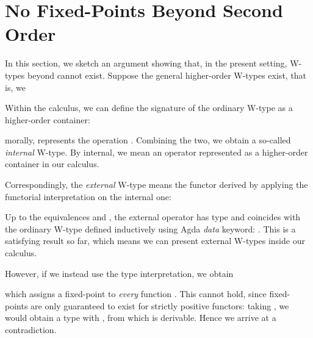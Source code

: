 \section{No Fixed-Points Beyond Second Order}
\label{sec:nogo}

In this section, we sketch an argument showing that, in the present setting,
W-types beyond  cannot exist. Suppose the general higher-order
W-types exist, that is, we 



Within the calculus, we can define the signature of the ordinary W-type as a
higher-order container:



morally,  represents the operation
\;\;\;\;\AgdaSymbol{(}\;\AgdaSymbol{)}. Combining the two, we obtain a so-called \emph{internal} W-type. By internal, we mean an operator represented as a higher-order container in our calculus.



Correspondingly, the \emph{external} W-type means the functor derived by applying the
functorial interpretation on the internal one:



Up to the equivalences
\;\AgdaSymbol{(}\AgdaInductiveConstructor{*}\;\;\AgdaInductiveConstructor{*}\AgdaSymbol{)}\;\;
and
\;\AgdaInductiveConstructor{*}\;\;,
the external operator  has type
\;\; and coincides with the
ordinary W-type defined inductively using Agda \emph{data} keyword: \;\;\AgdaSymbol{(}\;\AgdaSymbol{:}\;\AgdaSymbol{)}\;\AgdaSymbol{:}\;. This is a satisfying result so far, which means we can present external W-types inside our calculus.

However, if we instead use the type interpretation, we obtain



which assigns a fixed-point
\;\;\;\;\AgdaSymbol{(}\;\AgdaSymbol{)}
to \emph{every} function
\;\AgdaSymbol{:}\;\;\;.
This cannot hold, since fixed-points are only guaranteed to exist for strictly
positive functors: taking
\;\;\AgdaSymbol{=}\;\;\;,
we would obtain a type  with
\;\;\AgdaSymbol{(}\;\;\AgdaSymbol{)},
from which  is derivable. Hence we arrive at a contradiction.
